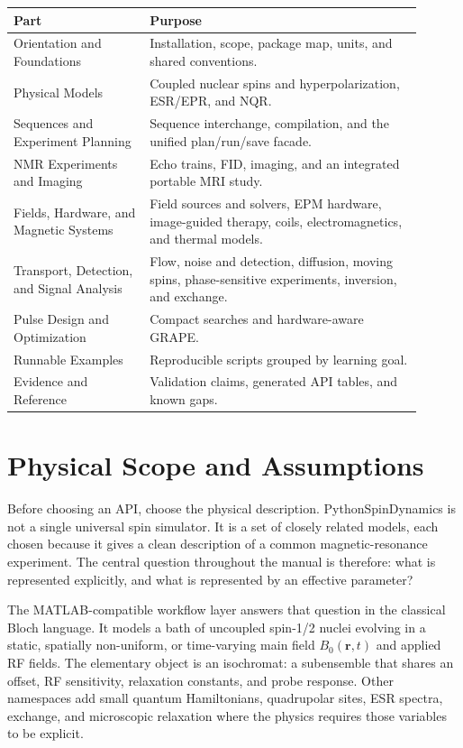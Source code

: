 \documentclass[11pt,oneside]{report}
\begin{document}
\begin{longtable}{p{0.30\linewidth}p{0.60\linewidth}}
\toprule
Part & Purpose \\
\midrule
Orientation and Foundations & Installation, scope, package map, units, and
shared conventions. \\
Physical Models & Coupled nuclear spins and hyperpolarization, ESR/EPR, and
NQR. \\
Sequences and Experiment Planning & Sequence interchange, compilation, and
the unified plan/run/save facade. \\
NMR Experiments and Imaging & Echo trains, FID, imaging, and an integrated
portable MRI study. \\
Fields, Hardware, and Magnetic Systems & Field sources and solvers, EPM
hardware, image-guided therapy, coils, electromagnetics, and thermal models. \\
Transport, Detection, and Signal Analysis & Flow, noise and detection,
diffusion, moving spins, phase-sensitive experiments, inversion, and exchange. \\
Pulse Design and Optimization & Compact searches and hardware-aware GRAPE. \\
Runnable Examples & Reproducible scripts grouped by learning goal. \\
Evidence and Reference & Validation claims, generated API tables, and known
gaps. \\
\bottomrule
\end{longtable}

\chapter{Physical Scope and Assumptions}
\label{chap:scope}

Before choosing an API, choose the physical description. PythonSpinDynamics is
not a single universal spin simulator. It is a set of
closely related models, each chosen because it gives a clean description of a
common magnetic-resonance experiment. The central question throughout the
manual is therefore: what is represented explicitly, and what is represented by
an effective parameter?

The MATLAB-compatible workflow layer answers that question in the classical
Bloch language. It models a bath of uncoupled spin-1/2 nuclei evolving in a
static, spatially non-uniform, or time-varying main field
\(B_0(\mathbf{r},t)\) and applied RF fields. The elementary object is an
isochromat: a subensemble that shares an offset, RF sensitivity, relaxation
constants, and probe response. Other namespaces add small quantum Hamiltonians,
quadrupolar sites, ESR spectra, exchange, and microscopic relaxation where the
physics requires those variables to be explicit.
\end{document}
